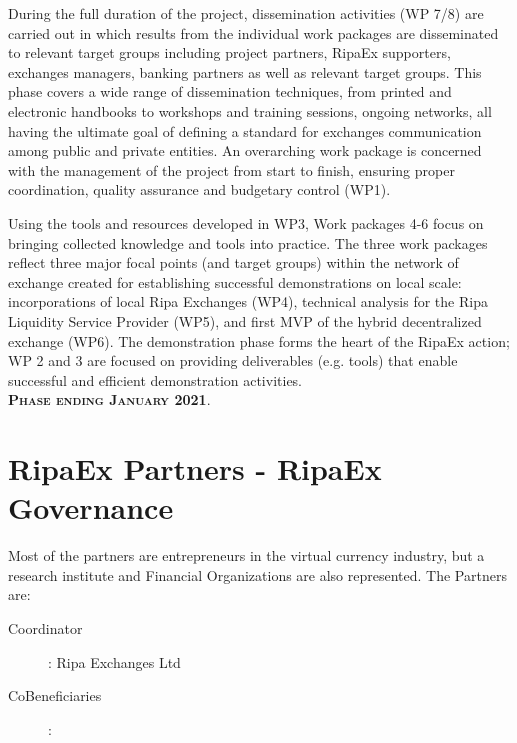 \documentclass[11pt,fleqn,oneside]{book} %
\begin{document}
\begin{center}
\begin{tcolorbox}[roadmapBox,
	title=\textsc{Dissemination (WP 7/8) and Project Coordination (WP1)}]
	During the full duration of the project, 
	dissemination activities (WP 7/8) are carried out in which results from the individual work packages are disseminated 
	to relevant target groups including project partners, RipaEx supporters, exchanges managers, banking partners as well 
	as relevant target groups. This phase covers a wide range of dissemination techniques, from printed and
    electronic handbooks to workshops and training sessions, ongoing networks, all having the
	ultimate goal of defining a standard for exchanges communication among public and private entities. 
	An overarching work package is concerned with the management of the project from start to finish, ensuring proper coordination, 
	quality assurance and budgetary control (WP1).
\end{tcolorbox}

\resizebox{0.05\textwidth}{26pt}{$\Downarrow$}

\begin{tcolorbox}[roadmapBox,
	title=\textsc{Development of hybrid-decentralized exchange (WP 4-6)}]

	Using the tools and resources developed in WP3, 
	Work packages 4-6 focus on bringing collected knowledge and tools into practice. The three work packages reflect three major
	focal points (and target groups) within the network of exchange created for establishing successful 
	demonstrations on local scale: incorporations of local Ripa Exchanges (WP4), technical analysis for the 
	Ripa Liquidity Service Provider (WP5), and first MVP of the hybrid decentralized exchange (WP6). The demonstration
    phase forms the heart of the RipaEx action; WP 2 and 3 are focused on providing
	deliverables (e.g. tools) that enable successful and efficient demonstration activities.\\
	\vspace{1cm}
	\centering\textbf{\textsc{Phase ending January 2021}}.
\end{tcolorbox}
\end{center}

\section{RipaEx Partners - RipaEx Governance}
Most of the partners are entrepreneurs in the virtual currency industry, but a research institute 
and Financial Organizations are also represented. The Partners are:
\begin{description}
	\item[Coordinator]: Ripa Exchanges Ltd
	\item[CoBeneficiaries]: 
\end{description}
\end{document}
